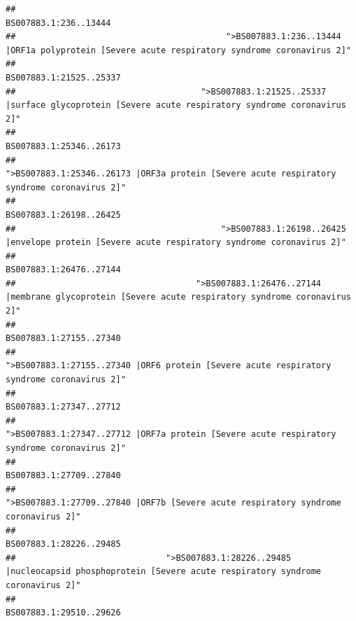 \documentclass[
]{article}
\begin{document}
\begin{verbatim}
##                                                                                                                  BS007883.1:236..13444 
##                                          ">BS007883.1:236..13444 |ORF1a polyprotein [Severe acute respiratory syndrome coronavirus 2]" 
##                                                                                                                BS007883.1:21525..25337 
##                                     ">BS007883.1:21525..25337 |surface glycoprotein [Severe acute respiratory syndrome coronavirus 2]" 
##                                                                                                                BS007883.1:25346..26173 
##                                            ">BS007883.1:25346..26173 |ORF3a protein [Severe acute respiratory syndrome coronavirus 2]" 
##                                                                                                                BS007883.1:26198..26425 
##                                         ">BS007883.1:26198..26425 |envelope protein [Severe acute respiratory syndrome coronavirus 2]" 
##                                                                                                                BS007883.1:26476..27144 
##                                    ">BS007883.1:26476..27144 |membrane glycoprotein [Severe acute respiratory syndrome coronavirus 2]" 
##                                                                                                                BS007883.1:27155..27340 
##                                             ">BS007883.1:27155..27340 |ORF6 protein [Severe acute respiratory syndrome coronavirus 2]" 
##                                                                                                                BS007883.1:27347..27712 
##                                            ">BS007883.1:27347..27712 |ORF7a protein [Severe acute respiratory syndrome coronavirus 2]" 
##                                                                                                                BS007883.1:27709..27840 
##                                                    ">BS007883.1:27709..27840 |ORF7b [Severe acute respiratory syndrome coronavirus 2]" 
##                                                                                                                BS007883.1:28226..29485 
##                              ">BS007883.1:28226..29485 |nucleocapsid phosphoprotein [Severe acute respiratory syndrome coronavirus 2]" 
##                                                                                                                BS007883.1:29510..29626 

\end{verbatim}
\end{document}
